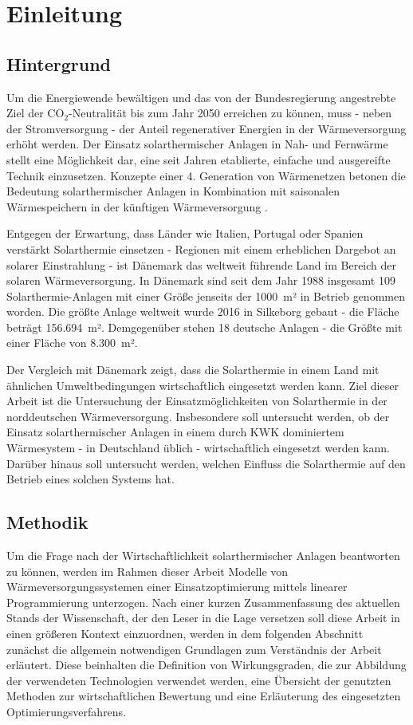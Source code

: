 \chapter{Einleitung}
\thispagestyle{empty}

\section{Hintergrund}
Um die Energiewende bewältigen und das von der Bundesregierung angestrebte Ziel der CO$_2$-Neutralität bis zum Jahr 2050 \cite{bundesministerium2016klimaschutzplan} erreichen zu können, muss - neben der Stromversorgung - der Anteil regenerativer Energien in der Wärmeversorgung erhöht werden. Der Einsatz solarthermischer Anlagen in Nah- und Fernwärme stellt eine Möglichkeit dar, eine seit Jahren etablierte, einfache und ausgereifte Technik einzusetzen. Konzepte einer 4. Generation von Wärmenetzen betonen die Bedeutung solarthermischer Anlagen in Kombination mit saisonalen Wärmespeichern in der künftigen Wärmeversorgung \cite{LUND20141}.

Entgegen der Erwartung, dass Länder wie Italien, Portugal oder Spanien verstärkt Solarthermie einsetzen - Regionen mit einem erheblichen Dargebot an solarer Einstrahlung - ist Dänemark das weltweit führende Land im Bereich der solaren Wärmeversorgung. In Dänemark sind seit dem Jahr 1988 insgesamt 109 Solarthermie-Anlagen mit einer Größe jenseits der 1000~m² in Betrieb genommen worden. Die größte Anlage weltweit wurde 2016 in Silkeborg gebaut - die Fläche beträgt 156.694~m². Demgegenüber stehen 18 deutsche Anlagen - die Größte mit einer Fläche von 8.300~m². \cite{SDH2019} 

Der Vergleich mit Dänemark zeigt, dass die Solarthermie in einem Land mit ähnlichen Umweltbedingungen wirtschaftlich eingesetzt werden kann. Ziel dieser Arbeit ist die Untersuchung der Einsatzmöglichkeiten von Solarthermie in der norddeutschen Wärmeversorgung. Insbesondere soll untersucht werden, ob der Einsatz solarthermischer Anlagen in einem durch \ac{KWK} dominiertem Wärmesystem - in Deutschland üblich - wirtschaftlich eingesetzt werden kann. Darüber hinaus soll untersucht werden, welchen Einfluss die Solarthermie auf den Betrieb eines solchen Systems hat. 

\section{Methodik}
Um die Frage nach der Wirtschaftlichkeit solarthermischer Anlagen beantworten zu können, werden im Rahmen dieser Arbeit Modelle von Wärmeversorgungssystemen einer Einsatzoptimierung mittels linearer Programmierung unterzogen. Nach einer kurzen Zusammenfassung des aktuellen Stands der Wissenschaft, der den Leser in die Lage versetzen soll diese Arbeit in einen größeren Kontext einzuordnen, werden in dem folgenden Abschnitt zunächst die allgemein notwendigen Grundlagen zum Verständnis der Arbeit erläutert. Diese beinhalten die Definition von Wirkungsgraden, die zur Abbildung der verwendeten Technologien verwendet werden, eine Übersicht der genutzten Methoden zur wirtschaftlichen Bewertung und eine Erläuterung des eingesetzten Optimierungsverfahrens.

